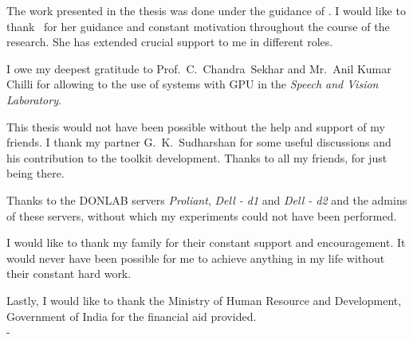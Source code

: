 \acknowledgements
The work presented in the thesis was done under the guidance of \thesisguide.  I would like to thank \thesisguide ~for her guidance  and constant motivation throughout the course of the research.  She has extended crucial support to me in different roles.

I owe my deepest gratitude to Prof.~C.~Chandra~Sekhar and Mr.~Anil Kumar Chilli for allowing to the use of systems with GPU in the {\it Speech and Vision Laboratory}.


This thesis would not have been possible without the help and support of my friends.  I thank my partner G.~K.~Sudharshan for some useful discussions and his contribution to the toolkit development. Thanks to all my friends, for just being there.

Thanks to the DONLAB servers \textit{Proliant}, \textit{Dell - d1} and \textit{Dell - d2} and the admins of these servers, without which my experiments could not have been performed.

I would like to thank my family for their constant support and encouragement.  It would never have been possible for me to achieve anything in my life without their constant hard work.

Lastly, I would like to thank the Ministry of Human Resource and Development, Government of India for the financial aid provided.\\

\hfill - \thesisauthor
